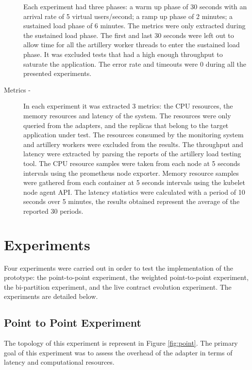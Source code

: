 \begin{description}
    Each experiment had three phases:
    a warm up phase of 30 seconds with an arrival rate of 5 virtual users/second;
    a ramp up phase of 2 minutes;
    a sustained load phase of 6 minutes.
    The metrics were only extracted during the sustained load phase.
    The first and last 30 seconds were left out to allow time for all the artillery worker threads to enter the sustained load phase.
    It was excluded tests that had a high enough throughput to saturate the application.
    The error rate and timeouts were 0 during all the presented experiments.
    \item[Metrics -] In each experiment it was extracted 3 metrics: the CPU resources, the memory resources and latency of the system.
    The resources were only queried from the adapters, and the replicas that belong to the target application under test.
    The resources consumed by the monitoring system and artillery workers were excluded from the results.
    The throughput and latency were extracted by parsing the reports of the artillery load testing tool.
    The CPU resource samples were taken from each node at 5 seconds intervals using the prometheus node exporter.
    Memory resource samples were gathered from each container at 5 seconds intervals using the kubelet node agent API.
    The latency statistics were calculated with a period of 10 seconds over 5 minutes, the results obtained represent the
    average of the reported 30 periods.
    \item[]
\end{description}

\section{Experiments} %
\label{sec:experiments}

Four experiments were carried out in order to test the implementation of the prototype:
the point-to-point experiment, the weighted point-to-point experiment, the bi-partition experiment, and the live contract evolution experiment.
The experiments are detailed below.

\subsection{Point to Point Experiment}

The topology of this experiment is represent in Figure \ref{fig:point}.
The primary goal of this experiment was to assess the overhead of the adapter in terms of latency and computational resources.

